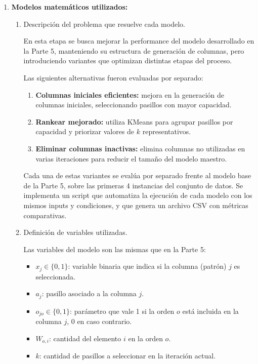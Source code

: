 \documentclass[a4paper,12pt]{article}
\begin{document}
\begin{enumerate}[label=(\alph*), leftmargin=2em]
    \item \textbf{Modelos matemáticos utilizados:}
    \begin{enumerate}[label=\roman*., leftmargin=0.2em]
    
        \item Descripción del problema que resuelve cada modelo.
        
            En esta etapa se busca mejorar la performance del modelo desarrollado en la Parte 5, manteniendo su estructura de generación de columnas, pero introduciendo variantes que optimizan distintas etapas del proceso. 

            Las siguientes alternativas fueron evaluadas por separado:

            \begin{enumerate}[label=\arabic*.]
                \item \textbf{Columnas iniciales eficientes:} mejora en la generación de columnas iniciales, seleccionando pasillos con mayor capacidad.
                \item \textbf{Rankear mejorado:} utiliza KMeans para agrupar pasillos por capacidad y priorizar valores de \(k\) representativos.
                \item \textbf{Eliminar columnas inactivas:} elimina columnas no utilizadas en varias iteraciones para reducir el tamaño del modelo maestro.
            \end{enumerate}

            Cada una de estas variantes se evalúa por separado frente al modelo base de la Parte 5, sobre las primeras 4 instancias del conjunto de datos. Se implementa un script que automatiza la ejecución de cada modelo con los mismos inputs y condiciones, y que genera un archivo CSV con métricas comparativas.

        \item Definición de variables utilizadas.

            Las variables del modelo son las mismas que en la Parte 5:

            \begin{itemize}
                \item \(x_j \in \{0,1\}\): variable binaria que indica si la columna (patrón) \(j\) es seleccionada.
                \item \(a_j\): pasillo asociado a la columna \(j\).
                \item \(o_{jo} \in \{0,1\}\): parámetro que vale 1 si la orden \(o\) está incluida en la columna \(j\), 0 en caso contrario.
                \item \(W_{o,i}\): cantidad del elemento \(i\) en la orden \(o\).
                \item \(k\): cantidad de pasillos a seleccionar en la iteración actual.
            \end{itemize}


\end{enumerate}
\end{enumerate}
\end{document}
